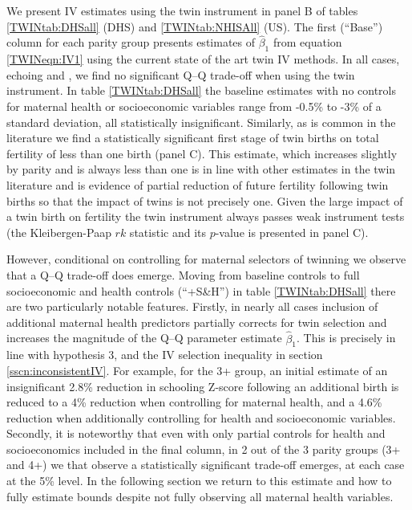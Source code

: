 \documentclass[subeqn]{article}
\begin{document}
\begin{spacing}{1.4}
We present IV estimates using the twin instrument in panel B of tables
\ref{TWINtab:DHSall} (DHS) and \ref{TWINtab:NHISAll} (US).  The first (``Base'')
column for each parity group presents estimates of $\hat\beta_1$ from equation
\ref{TWINeqn:IV1} using the current state of the art twin IV methods.  In all
cases, echoing \citet{Angristetal2010,Blacketal2005,Caceres2006} and
\citet{FitzsimonsMalde2014}, we find no significant Q--Q trade-off when using
the twin instrument.  In table \ref{TWINtab:DHSall} the baseline estimates
with no controls for maternal health or socioeconomic variables range from
-0.5\% to -3\% of a standard deviation, all statistically insignificant.
Similarly, as is common in the literature we find a statistically significant
first stage of twin births on total fertility of less than one birth (panel
C).  This estimate, which increases slightly by parity and is always less than
one is in line with other estimates in the twin literature and is evidence of
partial reduction of future fertility following twin births so that the impact
of twins is not precisely one.  Given the large impact of a twin birth on
fertility the twin instrument always passes weak instrument tests (the
Kleibergen-Paap $rk$ statistic and its $p$-value is presented in panel C).

However, conditional on controlling for maternal selectors of twinning we
observe that a Q--Q trade-off does emerge.  Moving from baseline controls to
full socioeconomic and health controls (``+S\&H'') in table
\ref{TWINtab:DHSall} there are two particularly notable features.  Firstly,
in nearly all cases inclusion of additional maternal health predictors
partially corrects for twin selection and increases the magnitude of the Q--Q
parameter estimate $\hat\beta_1$.  This is precisely in line with hypothesis
3, and the IV selection inequality in section \ref{sscn:inconsistentIV}. For
example, for the 3+ group, an initial estimate of an insignificant 2.8\%
reduction in schooling Z-score following an additional birth is reduced to a
4\% reduction when controlling for maternal health, and a 4.6\% reduction when
additionally controlling for health and socioeconomic variables.  Secondly, it
is noteworthy that even with only partial controls for health and
socioeconomics included in the final column, in 2 out of the 3 parity groups
(3+ and 4+) we that observe a statistically significant trade-off emerges,
at each case at the 5\% level.  In the following section we return to this
estimate and how to fully estimate bounds despite not fully observing all
maternal health variables.


\end{spacing}
\end{document}
